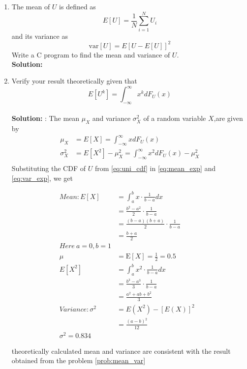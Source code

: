 \documentclass[12pt]{book}
\providecommand{\sbrak}[1]{\ensuremath{{}\left[#1\right]}}
\newcommand{\solution}{\noindent \textbf{Solution: }}
\begin{document}
\begin{enumerate}
\item
\label{prob:mean_var}
The mean of $U$ is defined as
%
\begin{equation}
E\sbrak{U} = \frac{1}{N}\sum_{i=1}^{N}U_i
\end{equation}
%
and its variance as
%
\begin{equation}
\text{var}\sbrak{U} = E\sbrak{U- E\sbrak{U}}^2 
\end{equation}
Write a C program to  find the mean and variance of $U$. \\
\solution
\begin{center}
\end{center}
\item Verify your result theoretically given that
%
\begin{equation}
E\sbrak{U^k} = \int_{-\infty}^{\infty}x^kdF_{U}(x)
\end{equation}\\
\solution: The mean $\mu_X$ and variance $\sigma_X^2$ of a random variable $X$,are given by
\begin{align}
	\label{eq:mean_exp}
	\mu_X &= E\sbrak{X} = \int_{-\infty}^{\infty}xdF_{U}(x) \\
	\label{eq:var_exp}
	\sigma_X^2 &= E\sbrak{X^2} - \mu_X^2 = \int_{-\infty}^{\infty}x^2dF_{U}(x) - \mu_X^2\\
\end{align}
Substituting the CDF of $U$ from \eqref{eq:uni_cdf} in \eqref{eq:mean_exp} and \eqref{eq:var_exp}, we get
\large
\begin{center}
\begin{align*}
 Mean:
E\sbrak{X} & =\int_a^b x \cdot \frac{1}{b-a} dx&\\
&= \frac{b^2-a^2}{2} \cdot \frac{1}{b-a}& \\
&= \frac{(b-a)(b+a)}{2} \cdot \frac{1}{b-a}& \\
&= \frac{b+a}{2} &\\
Here \  a=0,b=1&\\
\mu&= \mathrm{E}[X]= \frac{1}{2} = 0.5\\
E\sbrak{X^2}&=\int_a^b x^2 \cdot \frac{1}{b-a} dx\\ &=\frac{b^3-a^3}{3} \cdot \frac{1}{b-a} \\ &=\frac{a^2+ab+b^2}{3}&\\
Variance:
\sigma^2 &=E\left(X^2\right)-[E(X)]^2\\
&=\frac{(a-b)^2}{12}&\\
\sigma^2=0.834
\end{align*}
\end{center}
\normalsize
theoretically calculated mean and variance are consistent with the result obtained from the problem \ref{prob:mean_var}
\end{enumerate}
\end{document}
